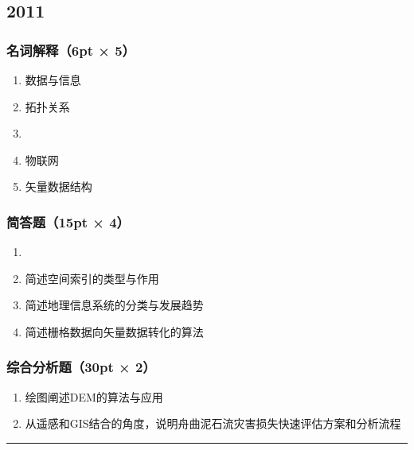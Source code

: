 \documentclass[]{article}
\begin{document}
\hypertarget{header-n396}{%
\subsection{2011}\label{header-n396}}

\hypertarget{header-n397}{%
\subsubsection{名词解释（6pt × 5）}\label{header-n397}}

\begin{enumerate}
\def\labelenumi{\arabic{enumi}.}
\item
  数据与信息
\item
  拓扑关系
\item
  📄
\item
  物联网
\item
  矢量数据结构
\end{enumerate}

\hypertarget{header-n409}{%
\subsubsection{简答题（15pt × 4）}\label{header-n409}}

\begin{enumerate}
\def\labelenumi{\arabic{enumi}.}
\item
  📄
\item
  简述空间索引的类型与作用
\item
  简述地理信息系统的分类与发展趋势
\item
  简述栅格数据向矢量数据转化的算法
\end{enumerate}

\hypertarget{header-n419}{%
\subsubsection{综合分析题（30pt × 2）}\label{header-n419}}

\begin{enumerate}
\def\labelenumi{\arabic{enumi}.}
\item
  绘图阐述DEM的算法与应用
\item
  从遥感和GIS结合的角度，说明舟曲泥石流灾害损失快速评估方案和分析流程
\end{enumerate}

\begin{center}\rule{0.5\linewidth}{\linethickness}\end{center}
\end{document}
